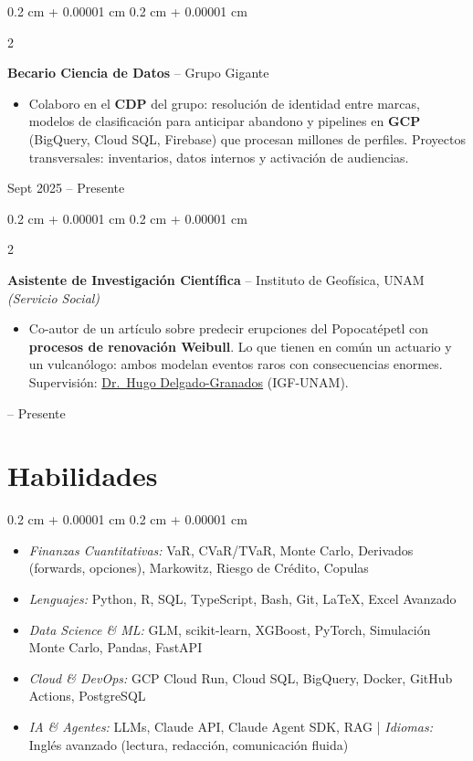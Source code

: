 \documentclass[10pt, letterpaper]{article}
\newenvironment{highlights}{
    \begin{itemize}[
        topsep=0.05 cm,
        parsep=0.05 cm,
        partopsep=0pt,
        itemsep=0pt,
        leftmargin=0.4 cm + 10pt
    ]
}{
    \end{itemize}
}
\newenvironment{highlightsforbulletentries}{
    \begin{itemize}[
        topsep=0.05 cm,
        parsep=0.05 cm,
        partopsep=0pt,
        itemsep=0pt,
        leftmargin=10pt
    ]
}{
    \end{itemize}
}
\newenvironment{onecolentry}{
    \begin{adjustwidth}{
        0.2 cm + 0.00001 cm
    }{
        0.2 cm + 0.00001 cm
    }
}{
    \end{adjustwidth}
}
\newenvironment{twocolentry}[2][]{
    \onecolentry
    \def\secondColumn{#2}
    \setcolumnwidth{\fill, 4.0 cm}
    \begin{paracol}{2}
}{
    \switchcolumn \raggedleft \secondColumn
    \end{paracol}
    \endonecolentry
}
\let\hrefWithoutArrow\href
\renewcommand{\href}[2]{\hrefWithoutArrow{#1}{\ifthenelse{\equal{#2}{}}{ }{#2 }\raisebox{.15ex}{\footnotesize \faExternalLink*}}}
\begin{document}
        \begin{twocolentry}{Sept 2025 -- Presente}
            \textbf{Becario Ciencia de Datos} -- Grupo Gigante
            \begin{highlights}
                \item Colaboro en el \textbf{CDP} del grupo: resolución de identidad entre marcas, modelos de clasificación para anticipar abandono y pipelines en \textbf{GCP} (BigQuery, Cloud SQL, Firebase) que procesan millones de perfiles. Proyectos transversales: inventarios, datos internos y activación de audiencias.
            \end{highlights}
        \end{twocolentry}

        \vspace{0.05 cm}

        \begin{twocolentry}{2025 -- Presente}
            \textbf{Asistente de Investigación Científica} -- Instituto de Geofísica, UNAM \textit{(Servicio Social)}
            \begin{highlights}
                \item Co-autor de un artículo sobre predecir erupciones del Popocatépetl con \textbf{procesos de renovación Weibull}. Lo que tienen en común un actuario y un vulcanólogo: ambos modelan eventos raros con consecuencias enormes. Supervisión: \hrefWithoutArrow{https://scholar.google.com/citations?user=lDD0DZQAAAAJ}{Dr.\ Hugo Delgado-Granados} (IGF-UNAM).
            \end{highlights}
        \end{twocolentry}


    \section{Habilidades}

\begin{onecolentry}
    \begin{highlightsforbulletentries}
        \item \textit{Finanzas Cuantitativas:} VaR, CVaR/TVaR, Monte Carlo, Derivados (forwards, opciones), Markowitz, Riesgo de Crédito, Copulas
        \item \textit{Lenguajes:} Python, R, SQL, TypeScript, Bash, Git, \LaTeX, Excel Avanzado
        \item \textit{Data Science \& ML:} GLM, scikit-learn, XGBoost, PyTorch, Simulación Monte Carlo, Pandas, FastAPI
        \item \textit{Cloud \& DevOps:} GCP Cloud Run, Cloud SQL, BigQuery, Docker, GitHub Actions, PostgreSQL
        \item \textit{IA \& Agentes:} LLMs, Claude API, Claude Agent SDK, RAG | \textit{Idiomas:} Inglés avanzado (lectura, redacción, comunicación fluida)
    \end{highlightsforbulletentries}
\end{onecolentry}
\end{document}
